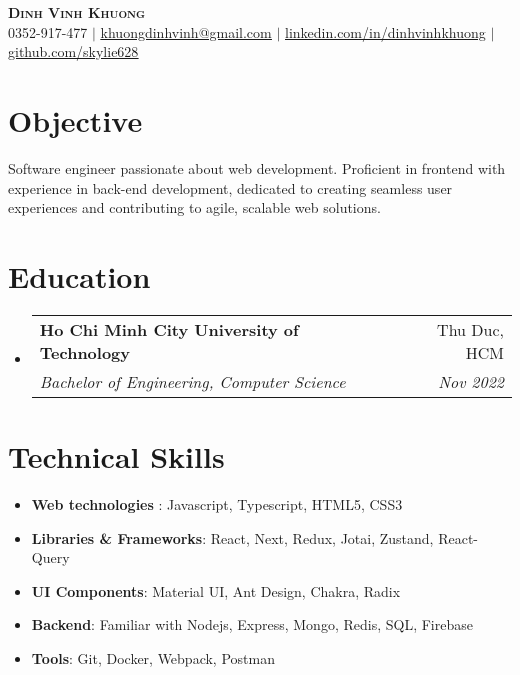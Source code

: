 \documentclass[letterpaper,11pt]{article}
\makeatletter
\newcommand{\resumeItem}[1]{
  \item\small{
    {#1 \vspace{-2pt}}
  }
}
\newcommand{\resumeSubheading}[4]{
  \vspace{-2pt}\item
    \begin{tabular*}{0.97\textwidth}[t]{l@{\extracolsep{\fill}}r}
      \textbf{#1} & #2 \\
      \textit{\small#3} & \textit{\small #4} \\
    \end{tabular*}\vspace{-7pt}
}
\newcommand{\resumeSubHeadingListStart}{\begin{itemize}[leftmargin=0.15in, label={}]}
\newcommand{\resumeSubHeadingListEnd}{\end{itemize}}
\newcommand{\resumeItemListStart}{\begin{itemize}}
\newcommand{\resumeItemListEnd}{\end{itemize}\vspace{-5pt}}
\makeatother
\begin{document}

\begin{center}
    \textbf{\Huge \scshape Dinh Vinh Khuong} \\ \vspace{1pt}
    \small 0352-917-477 $|$ \underline{\href{mailto:khuongdinhvinh@gmail.com}{khuongdinhvinh@gmail.com}}
    $|$ 
    \underline{\href{https://linkedin.com/in/dinhvinhkhuong}{linkedin.com/in/dinhvinhkhuong}}
   $|$
    \underline{\href{https://github.com/skylie628}{github.com/skylie628}}
\end{center}

\section{\textbf{Objective}}
  Software engineer passionate about web development. Proficient in frontend with experience in back-end development, dedicated to creating seamless user experiences and contributing to agile, scalable web solutions. 


\section{\textbf{Education}}
  \resumeSubHeadingListStart
    \resumeSubheading
      {Ho Chi Minh City University of Technology}{Thu Duc, HCM}
      {Bachelor of Engineering, Computer Science}{Nov 2022}
  \resumeSubHeadingListEnd


\section{\textbf{Technical Skills}}
 \begin{itemize}[leftmargin=0.15in, label={}]
  \resumeItemListStart
     \resumeItem{\textbf{Web technologies} : Javascript, Typescript, HTML5, CSS3}
     \resumeItem{ \textbf{Libraries \& Frameworks}: React, Next, Redux, Jotai, Zustand, React-Query} 
    \resumeItem{   \textbf{UI Components}: Material UI, Ant Design, Chakra, Radix }
      \resumeItem{\textbf{Backend}: Familiar with Nodejs, Express, Mongo, Redis, SQL, Firebase}
      \resumeItem{\textbf{Tools}: Git, Docker, Webpack, Postman}
     \resumeItemListEnd
 \end{itemize}
\end{document}
